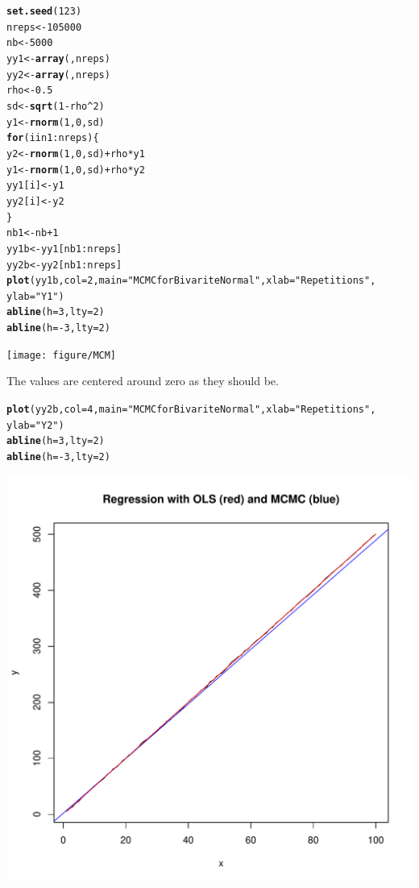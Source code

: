 \documentclass[12pt, a4paper, oneside]{article}\usepackage{graphicx, color}
\makeatletter
\def\maxwidth{ %
  \ifdim\Gin@nat@width>\linewidth
    \linewidth
  \else
    \Gin@nat@width
  \fi
}
\newcommand{\hlfunctioncall}[1]{\textcolor[rgb]{0.501960784313725,0,0.329411764705882}{\textbf{#1}}}%
\newcommand{\hlstring}[1]{\textcolor[rgb]{0.6,0.6,1}{#1}}%
\newenvironment{kframe}{%
 \def\at@end@of@kframe{}%
 \ifinner\ifhmode%
  \def\at@end@of@kframe{\end{minipage}}%
  \begin{minipage}{\columnwidth}%
 \fi\fi%
 \def\FrameCommand##1{\hskip\@totalleftmargin \hskip-\fboxsep
 \colorbox{shadecolor}{##1}\hskip-\fboxsep
     \hskip-\linewidth \hskip-\@totalleftmargin \hskip\columnwidth}%
 \MakeFramed {\advance\hsize-\width
   \@totalleftmargin\z@ \linewidth\hsize
   \@setminipage}}%
 {\par\unskip\endMakeFramed%
 \at@end@of@kframe}
\newenvironment{knitrout}{}{} %
\makeatother
\begin{document}
\begin{knitrout}
\color{fgcolor}\begin{kframe}
\begin{alltt}
\hlfunctioncall{set.seed}(123)
nreps <- 105000
nb <- 5000
yy1 <- \hlfunctioncall{array}(, nreps)
yy2 <- \hlfunctioncall{array}(, nreps)
rho <- 0.5
sd <- \hlfunctioncall{sqrt}(1 - rho^2)
y1 <- \hlfunctioncall{rnorm}(1, 0, sd)
\hlfunctioncall{for} (i in 1:nreps) \{
    y2 <- \hlfunctioncall{rnorm}(1, 0, sd) + rho * y1
    y1 <- \hlfunctioncall{rnorm}(1, 0, sd) + rho * y2
    yy1[i] <- y1
    yy2[i] <- y2
\}
nb1 <- nb + 1
yy1b <- yy1[nb1:nreps]
yy2b <- yy2[nb1:nreps]
\hlfunctioncall{plot}(yy1b, col = 2, main = \hlstring{"MCMC for Bivarite Normal"}, xlab = \hlstring{"Repetitions"}, 
    ylab = \hlstring{"Y1"})
\hlfunctioncall{abline}(h = 3, lty = 2)
\hlfunctioncall{abline}(h = -3, lty = 2)
\end{alltt}
\end{kframe}
\texttt{[image: figure/MCM]} 

\end{knitrout}

The values are centered around zero as they should be. 
\begin{knitrout}
\color{fgcolor}\begin{kframe}
\begin{alltt}
\hlfunctioncall{plot}(yy2b, col = 4, main = \hlstring{"MCMC for Bivarite Normal"}, xlab = \hlstring{"Repetitions"}, 
    ylab = \hlstring{"Y2"})
\hlfunctioncall{abline}(h = 3, lty = 2)
\hlfunctioncall{abline}(h = -3, lty = 2)
\end{alltt}
\end{kframe}
\includegraphics[width=\maxwidth]{figure/MCMC2} 

\end{knitrout}
\end{document}
